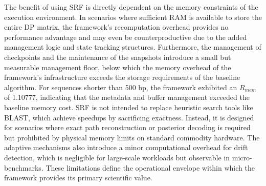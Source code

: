 The benefit of using SRF is directly dependent on the memory constraints of the execution environment. In scenarios where sufficient RAM is available to store the entire DP matrix, the framework's recomputation overhead provides no performance advantage and may even be counterproductive due to the added management logic and state tracking structures. Furthermore, the management of checkpoints and the maintenance of the snapshots introduce a small but measurable management floor, below which the memory overhead of the framework's infrastructure exceeds the storage requirements of the baseline algorithm. For sequences shorter than 500 bp, the framework exhibited an $R_{mem}$ of 1.10777, indicating that the metadata and buffer management exceeded the baseline memory cost. SRF is not intended to replace heuristic search tools like BLAST, which achieve speedups by sacrificing exactness. Instead, it is designed for scenarios where exact path reconstruction or posterior decoding is required but prohibited by physical memory limits on standard commodity hardware. The adaptive mechanisms also introduce a minor computational overhead for drift detection, which is negligible for large-scale workloads but observable in micro-benchmarks. These limitations define the operational envelope within which the framework provides its primary scientific value.


